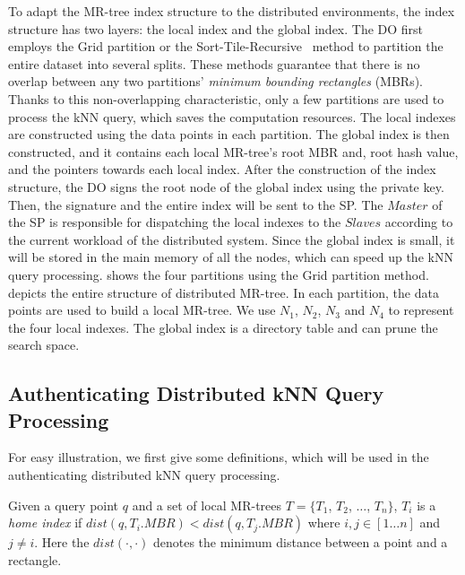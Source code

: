 To adapt the MR-tree index structure to the distributed environments, the index structure has two layers: the local index and the global index. The DO first employs the Grid partition or the Sort-Tile-Recursive~\cite{10.1109/ICDE.1997.582015} method to partition the entire dataset into several splits. These methods guarantee that there is no overlap between any two partitions' \emph{minimum bounding rectangles} (MBRs). Thanks to this non-overlapping characteristic, only a few partitions are used to process the kNN query, which saves the computation resources. The local indexes are constructed using the data points in each partition. The global index is then constructed, and it contains each local MR-tree's root MBR and, root hash value, and the pointers towards each local index. After the construction of the index structure, the DO signs the root node of the global index using the private key. Then, the signature and the entire index will be sent to the SP\@. The $Master$ of the SP is responsible for dispatching the local indexes to the $Slaves$ according to the current workload of the distributed system. Since the global index is small, it will be stored in the main memory of all the nodes, which can speed up the kNN query processing.  shows the four partitions using the Grid partition method.  depicts the entire structure of distributed MR-tree. In each partition, the data points are used to build a local MR-tree. We use $N_{1}$, $N_{2}$, $N_{3}$ and $N_{4}$ to represent the four local indexes. The global index is a directory table and can prune the search space.

\subsection{Authenticating Distributed kNN Query Processing}

For easy illustration, we first give some definitions, which will be used in the authenticating distributed kNN query processing.

\begin{definition}\label{def:knn:def1}
  Given a query point $q$ and a set of local MR-trees $T = \{T_{1}$, $T_{2}$, $\dots$, $T_{n}\}$, $T_{i}$ is a \emph{home index} if $dist(q,T_{i}.MBR) < dist(q,T_{j}.MBR)$ where $i, j\in [1 \dots n]$ and $j \neq i$. Here the $dist(\cdot,\cdot)$ denotes the minimum distance between a point and a rectangle.
\end{definition}

